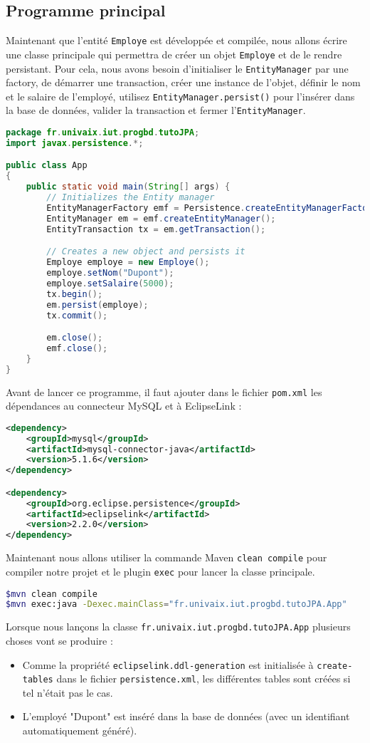 \documentclass[a4paper,11pt]{article}
\begin{document}
\subsection{Programme principal}
Maintenant que l'entité \texttt{Employe} est développée et compilée, nous allons écrire une classe principale qui 
permettra de créer un objet \texttt{Employe} et de le rendre persistant. Pour cela, nous avons besoin d'initialiser le 
\texttt{EntityManager} par une factory, de démarrer une transaction, créer une instance de l'objet, 
définir le nom et le salaire de l'employé, utilisez \texttt{EntityManager.persist()} pour l'insérer dans la base de données, 
valider la transaction et fermer l'\texttt{EntityManager}.
\begin{lstlisting}[language=Java,style=customjava]
package fr.univaix.iut.progbd.tutoJPA;
import javax.persistence.*;

public class App 
{
    public static void main(String[] args) {
        // Initializes the Entity manager
        EntityManagerFactory emf = Persistence.createEntityManagerFactory("employePU");
        EntityManager em = emf.createEntityManager();
        EntityTransaction tx = em.getTransaction();

        // Creates a new object and persists it
        Employe employe = new Employe();
        employe.setNom("Dupont");
        employe.setSalaire(5000);
        tx.begin();
        em.persist(employe);
        tx.commit();

        em.close();
        emf.close();
    }
}
\end{lstlisting}
Avant de lancer ce programme, il faut ajouter dans le fichier \texttt{pom.xml} les dépendances au connecteur MySQL et à EclipseLink :
\begin{lstlisting}[language=XML,style=customxml]
<dependency>
	<groupId>mysql</groupId>
	<artifactId>mysql-connector-java</artifactId>
	<version>5.1.6</version>
</dependency>

<dependency>
	<groupId>org.eclipse.persistence</groupId>
	<artifactId>eclipselink</artifactId>
	<version>2.2.0</version>
</dependency>
\end{lstlisting}
Maintenant nous allons utiliser la commande Maven \texttt{clean compile} pour compiler notre projet et le plugin \texttt{exec} pour lancer 
la classe principale.
\begin{lstlisting}[language=sh,style=customsh]
$mvn clean compile
$mvn exec:java -Dexec.mainClass="fr.univaix.iut.progbd.tutoJPA.App"
\end{lstlisting}
Lorsque nous lançons la classe \texttt{fr.univaix.iut.progbd.tutoJPA.App} plusieurs choses vont se produire :
\begin{itemize}
  \item Comme la propriété \texttt{eclipselink.ddl-generation} est initialisée à \texttt{create-tables} dans le fichier 
  \texttt{persistence.xml}, les différentes tables sont créées si tel n'était pas le cas.
  \item L'employé "Dupont" est inséré dans la base de données (avec un identifiant automatiquement généré).
\end{itemize}
\end{document}
